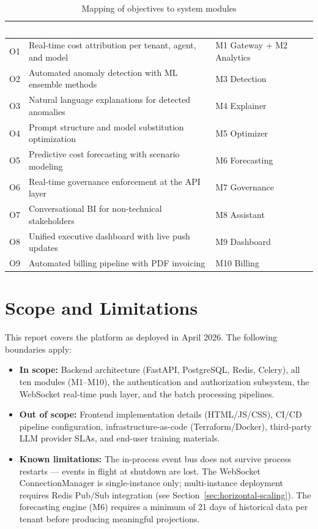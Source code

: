 \documentclass[12pt,a4paper,twoside]{report}
\begin{document}
\begin{table}[H]
\centering
\begin{tabularx}{\textwidth}{|c|l|X|}
\hline
\rowcolor{tabheader}
\textcolor{white}{\textbf{\#}} &
\textcolor{white}{\textbf{Objective}} &
\textcolor{white}{\textbf{Addressed By}} \\
\hline
O1 & Real-time cost attribution per tenant, agent, and model & M1 Gateway + M2 Analytics \\
\hline
O2 & Automated anomaly detection with ML ensemble methods & M3 Detection \\
\hline
O3 & Natural language explanations for detected anomalies & M4 Explainer \\
\hline
O4 & Prompt structure and model substitution optimization & M5 Optimizer \\
\hline
O5 & Predictive cost forecasting with scenario modeling & M6 Forecasting \\
\hline
O6 & Real-time governance enforcement at the API layer & M7 Governance \\
\hline
O7 & Conversational BI for non-technical stakeholders & M8 Assistant \\
\hline
O8 & Unified executive dashboard with live push updates & M9 Dashboard \\
\hline
O9 & Automated billing pipeline with PDF invoicing & M10 Billing \\
\hline
\end{tabularx}
\caption{Mapping of objectives to system modules}
\end{table}

\section{Scope and Limitations}

This report covers the platform as deployed in April 2026. The following boundaries apply:

\begin{itemize}
  \item \textbf{In scope:} Backend architecture (FastAPI, PostgreSQL, Redis, Celery), all ten modules (M1--M10), the authentication and authorization subsystem, the WebSocket real-time push layer, and the batch processing pipelines.

  \item \textbf{Out of scope:} Frontend implementation details (HTML/JS/CSS), CI/CD pipeline configuration, infrastructure-as-code (Terraform/Docker), third-party LLM provider SLAs, and end-user training materials.

  \item \textbf{Known limitations:} The in-process event bus does not survive process restarts — events in flight at shutdown are lost. The WebSocket ConnectionManager is single-instance only; multi-instance deployment requires Redis Pub/Sub integration (see Section~\ref{sec:horizontal-scaling}). The forecasting engine (M6) requires a minimum of 21 days of historical data per tenant before producing meaningful projections.
\end{itemize}
\end{document}
